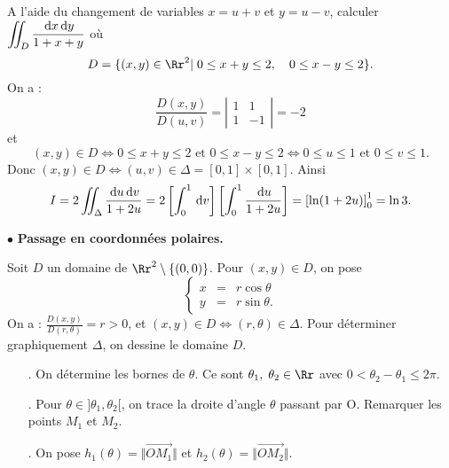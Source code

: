 \documentclass[class=report,crop=false]{standalone}
\begin{document}
\vskip6mm

A l'aide du changement de variables $x=u+v$ et $y=u-v$, calculer $\displaystyle \int \!\!\!\!\int _D\frac{\,\mathrm{d} x\,\mathrm{d} y}{1+x+y}$ o\`u  
$$D=\{(x,y)\in \Rr^ 2|\; 0\leq x+y\leq 2,\quad 0\leq x-y\leq 2\}.$$
On a :
$$\frac{D(x,y)}{D(u,v)}=\left|\begin{array}{cc}1&1 \\ 1&-1 \end{array}\right|=-2$$
et
$$(x,y)\in D\Leftrightarrow 0\leq x+y\leq 2\mbox{ et }0\leq x-y\leq 2\Leftrightarrow 0\leq u\leq 1\mbox{ et }0\leq v\leq 1.$$
Donc $(x,y)\in D\Leftrightarrow (u,v)\in \Delta =[0,1]\times [0,1]$. Ainsi
$$\displaystyle I=2\int \!\!\!\!\int _{\Delta}\frac{\,\mathrm{d} u\,\mathrm{d} v}{1+2u}=2\left[\int _0^1\,\mathrm{d} v\right]\left[\int _{0}^{1}\frac{\,\mathrm{d} u}{1+2u}\right]=\left[\ln (1+2u)\right]_{0}^1=\ln 3.$$

\vskip6mm

\noindent $\bullet $ {\bf Passage en coordonnées polaires.}

\vskip4mm

\noindent Soit $D$ un domaine de $\Rr^2\setminus \{(0,0)\}$. Pour $(x,y)\in D$, on pose 
$$\left\{\begin{array}{ccc}x&=&r\cos \theta \\ y&=&r\sin \theta .\end{array}\right. $$
On a : $\displaystyle \frac{D(x,y)}{D(r,\theta)}=r>0$, et $(x,y)\in D\Leftrightarrow (r,\theta )\in \Delta $. Pour déterminer graphiquement $\Delta$, on dessine le domaine $D$.


\begin{enumerate}
\item[.] On détermine les bornes de $\theta $. Ce sont $\theta _1,\;\theta _2\in \Rr$ avec $0<\theta _2-\theta _1\leq 2\pi$.
\item[.] Pour $\theta \in ]\theta _1,\theta _2[$, on trace la droite d'angle $\theta $ passant par O. Remarquer les points $M_1$ et $M_2$.
\item[.] On pose $h_1(\theta )=\Vert\overrightarrow{OM_1}\Vert $ et $h_2(\theta )=\Vert\overrightarrow{OM_2}\Vert $.
\end{enumerate}
\end{document}
